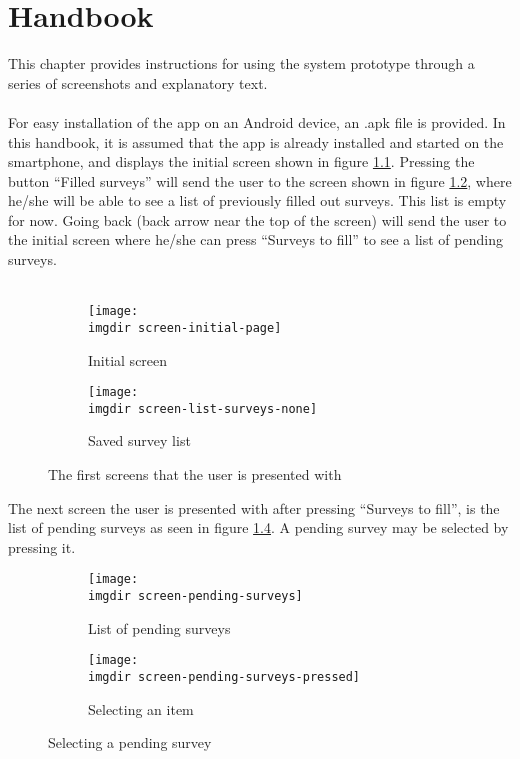 \chapter{Handbook}
\label{chap:handbook}
This chapter provides instructions for using the system prototype through a series of screenshots and explanatory text.\\\\
For easy installation of the app on an Android device, an .apk file is provided. In this handbook, it is assumed that the app is already installed and started on the smartphone, and displays the initial screen shown in figure \ref{fig:screen-initial-page}. Pressing the button ``Filled surveys'' will send the user to the screen shown in figure \ref{fig:screen-list-surveys-none}, where he/she will be able to see a list of previously filled out surveys. This list is empty for now. Going back (back arrow near the top of the screen) will send the user to the initial screen where he/she can press ``Surveys to fill'' to see a list of pending surveys.\\\\
\begin{figure}[!htbp]
 \centering

 \begin{subfigure}{.3\textwidth}
    \centering
    \texttt{[image: \\imgdir screen-initial-page]}
    \caption{Initial screen}
    \label{fig:screen-initial-page}
  \end{subfigure}
  \begin{subfigure}{.3\textwidth}
    \centering
    \texttt{[image: \\imgdir screen-list-surveys-none]}
    \caption{Saved survey list}
    \label{fig:screen-list-surveys-none}
  \end{subfigure}

  \caption{The first screens that the user is presented with}
  \label{fig:screen-initial-pages}
\end{figure}

The next screen the user is presented with after pressing ``Surveys to fill'', is the list of pending surveys as seen in figure \ref{fig:screen-pending-surveys}. A pending survey may be selected by pressing it.
\newpage

\begin{figure}[!htbp]
 \centering
 \begin{subfigure}{.3\textwidth}
    \centering
    \texttt{[image: \\imgdir screen-pending-surveys]}
    \caption{List of pending surveys}
    \label{fig:screen-pending-surveys}
  \end{subfigure}
  \begin{subfigure}{.3\textwidth}
    \centering
    \texttt{[image: \\imgdir screen-pending-surveys-pressed]}
    \caption{Selecting an item}
    \label{fig:screen-pending-surveys-pressed}
  \end{subfigure}
  \caption{Selecting a pending survey}
   \label{fig:screens-selecting-pending-survey}
\end{figure}

